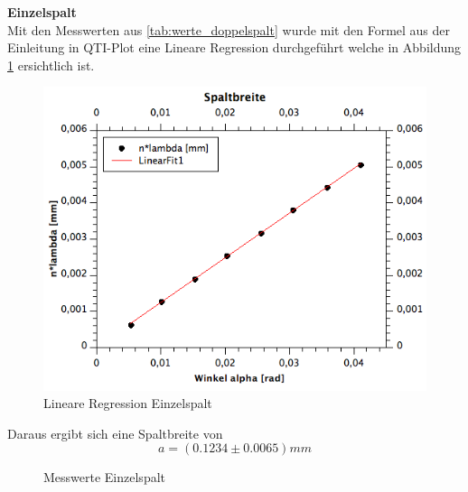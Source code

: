 \documentclass[12pt,a4paper]{article}
\begin{document}
\begin{multicols}{2}
\noindent
\textbf{Einzelspalt}\\
Mit den Messwerten aus \ref{tab:werte_doppelspalt} wurde mit den Formel aus der Einleitung in QTI-Plot eine Lineare Regression durchgeführt welche in Abbildung \ref{fig:einzelspalt_linreg} ersichtlich ist. 
\begin{figure}[H]
	\centering
	\includegraphics[scale=0.4]{./figure/linreg_einzelspalt.png}
	\caption{Lineare Regression Einzelspalt}
	\label{fig:einzelspalt_linreg}
\end{figure}
Daraus ergibt sich eine Spaltbreite von 
$$a = (0.1234 \pm 0.0065)mm$$
\begin{figure}[H]
	\centering
	\caption{Messwerte Einzelspalt}
	\label{tab:werte_einzelspalt}
\end{figure}


\end{multicols}
\end{document}
